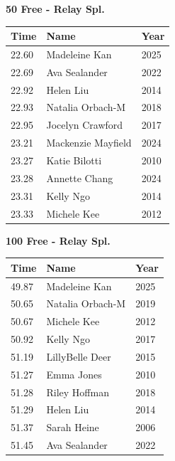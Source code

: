 \vspace{1.2em}
\noindent\begin{minipage}[t]{0.48\textwidth}
\centering
\textbf{\textcolor{teamprimary}{50 Free - Relay Spl.}}\par
\vspace{0.5em}
\centering
\small
\renewcommand{\arraystretch}{1.0}
\setlength{\tabcolsep}{4pt}
\begin{tabular}{@{}p{1.8cm}p{3.0cm}p{1.0cm}@{}}
\toprule
\textbf{Time} & \textbf{Name} & \textbf{Year} \\
\midrule
22.60 & Madeleine Kan & 2025 \\
22.69 & Ava Sealander & 2022 \\
22.92 & Helen Liu & 2014 \\
22.93 & Natalia Orbach-M & 2018 \\
22.95 & Jocelyn Crawford & 2017 \\
23.21 & Mackenzie Mayfield & 2024 \\
23.27 & Katie Bilotti & 2010 \\
23.28 & Annette Chang & 2024 \\
23.31 & Kelly Ngo & 2014 \\
23.33 & Michele Kee & 2012 \\
\bottomrule
\end{tabular}
\end{minipage}
\hfill
\begin{minipage}[t]{0.48\textwidth}
\centering
\textbf{\textcolor{teamprimary}{100 Free - Relay Spl.}}\par
\vspace{0.5em}
\centering
\small
\renewcommand{\arraystretch}{1.0}
\setlength{\tabcolsep}{4pt}
\begin{tabular}{@{}p{1.8cm}p{3.0cm}p{1.0cm}@{}}
\toprule
\textbf{Time} & \textbf{Name} & \textbf{Year} \\
\midrule
49.87 & Madeleine Kan & 2025 \\
50.65 & Natalia Orbach-M & 2019 \\
50.67 & Michele Kee & 2012 \\
50.92 & Kelly Ngo & 2017 \\
51.19 & LillyBelle Deer & 2015 \\
51.27 & Emma Jones & 2010 \\
51.28 & Riley Hoffman & 2018 \\
51.29 & Helen Liu & 2014 \\
51.37 & Sarah Heine & 2006 \\
51.45 & Ava Sealander & 2022 \\
\bottomrule
\end{tabular}
\end{minipage}

